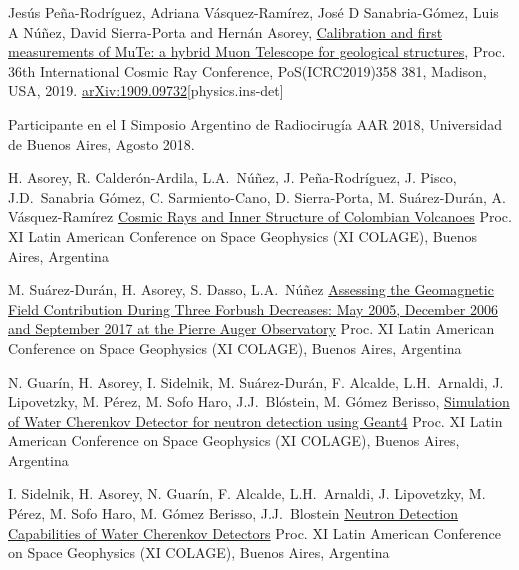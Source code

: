 \begin{etaremune}
\item {} Jesús Peña-Rodríguez, Adriana Vásquez-Ramírez, José D Sanabria-Gómez, Luis A Núñez, David Sierra-Porta and Hernán Asorey, \href{https://pos.sissa.it/358/381/}{Calibration and first measurements of MuTe: a hybrid Muon Telescope for geological structures}, \en Proc.
36th International Cosmic Ray Conference, PoS(ICRC2019)358 381, Madison, USA, 2019. \href{http://arxiv.org/abs/1909.09732}{arXiv:1909.09732}[physics.ins-det]

\item {} Participante en el I Simposio Argentino de Radiocirugía AAR 2018, Universidad de Buenos Aires, Agosto 2018. 

\item {} H. Asorey, R. Calderón-Ardila, L.A.\ Núñez, J. Peña-Rodríguez, J. Pisco, J.D.\ Sanabria Gómez, C. Sarmiento-Cano, D. Sierra-Porta, M. Suárez-Durán, A. Vásquez-Ramírez \href{}{{Cosmic Rays and Inner Structure of Colombian Volcanoes}} \en Proc.
XI Latin American Conference on Space Geophysics (XI COLAGE), Buenos Aires, Argentina %

\item {} M. Suárez-Durán, H. Asorey, S. Dasso, L.A.\ Núñez \href{}{{Assessing the Geomagnetic Field Contribution During Three Forbush Decreases: May 2005, December 2006 and September 2017 at the Pierre Auger Observatory}} \en Proc.
XI Latin American Conference on Space Geophysics (XI COLAGE), Buenos Aires, Argentina %

\item {} N. Guarín, H. Asorey, I. Sidelnik, M. Suárez-Durán, F. Alcalde, L.H.\ Arnaldi, J. Lipovetzky, M. Pérez, M. Sofo Haro, J.J.\ Blóstein, M. Gómez Berisso, \href{}{{Simulation of Water Cherenkov Detector for neutron detection using Geant4}} \en Proc.
XI Latin American Conference on Space Geophysics (XI COLAGE),  Buenos Aires, Argentina %

\item {} I. Sidelnik, H. Asorey, N. Guarín, F. Alcalde, L.H.\ Arnaldi, J. Lipovetzky, M. Pérez, M. Sofo Haro, M. Gómez Berisso, J.J.\ Blostein \href{}{{Neutron Detection Capabilities of Water Cherenkov Detectors}} \en Proc.
XI Latin American Conference on Space Geophysics (XI COLAGE),  Buenos Aires, Argentina%


\end{etaremune}
